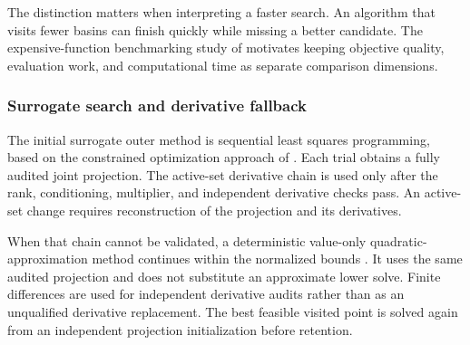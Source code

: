 The distinction matters when interpreting a faster search. An algorithm that visits fewer basins can finish quickly while missing a better candidate. The expensive-function benchmarking study of \citet{Bliek2023} motivates keeping objective quality, evaluation work, and computational time as separate comparison dimensions.

\subsubsection{Surrogate search and derivative fallback}

The initial surrogate outer method is sequential least squares programming, based on the constrained optimization approach of \citet{Kraft1988}. Each trial obtains a fully audited joint projection. The active-set derivative chain is used only after the rank, conditioning, multiplier, and independent derivative checks pass. An active-set change requires reconstruction of the projection and its derivatives.

When that chain cannot be validated, a deterministic value-only quadratic-approximation method continues within the normalized bounds \citep{Ragonneau2022}. It uses the same audited projection and does not substitute an approximate lower solve. Finite differences are used for independent derivative audits rather than as an unqualified derivative replacement. The best feasible visited point is solved again from an independent projection initialization before retention.

